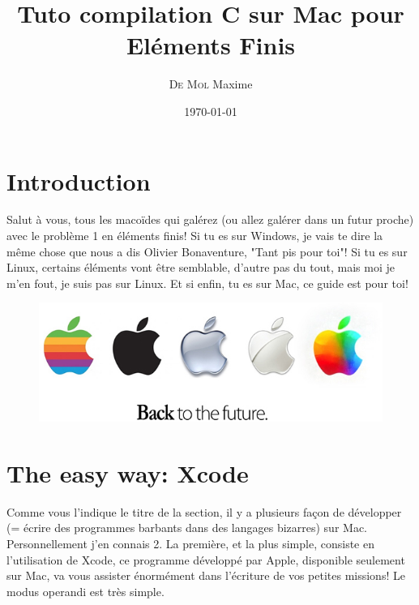 \documentclass[11pt,a4paper]{article}
\author{\textsc{De Mol} Maxime}
\title{Tuto compilation C sur Mac pour Eléments Finis}
\date{\today}
\begin{document}
\maketitle

\section{Introduction}

Salut à vous, tous les macoïdes qui galérez (ou allez galérer dans un futur proche) avec le problème 1 en éléments finis! Si tu es sur Windows, je vais te dire la même chose que nous a dis Olivier Bonaventure, "Tant pis pour toi"! Si tu es sur Linux, certains éléments vont être semblable, d'autre pas du tout, mais moi je m'en fout, je suis pas sur Linux. Et si enfin, tu es sur Mac, ce guide est pour toi!

\begin{figure}[H]
\includegraphics[width=\linewidth]{nouveau-logo-apple.jpg}
\end{figure}

\section{The easy way: Xcode}

Comme vous l'indique le titre de la section, il y a plusieurs façon de développer (= écrire des programmes barbants dans des langages bizarres) sur Mac. Personnellement j'en connais 2. La première, et la plus simple, consiste en l'utilisation de Xcode, ce programme développé par Apple, disponible seulement sur Mac, va vous assister énormément dans l'écriture de vos petites missions! Le modus operandi est très simple.
\end{document}
